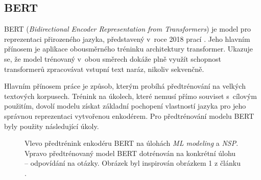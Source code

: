 \subsection{BERT}
BERT (\textit{Bidirectional Encoder Representation from Transformers}) je model pro reprezentaci přirozeného jazyka, představený v~roce 2018 prací \cite{BERT}. Jeho hlavním přínosem je aplikace obousměrného tréninku  architektury transformer. Ukazuje se, že model trénovaný v~obou směrech dokáže plně využít schopnost transformerů zpracovávat vstupní text naráz, nikoliv sekvenčně.\par\smallskip
Hlavním přínosem práce \cite{BERT} je způsob, kterým probíhá předtrénování na velkých textových korpusech. Trénink na úkolech, které nemusí přímo souviset s~cílovým použitím, dovolí modelu získat základní pochopení vlastností jazyka pro jeho správnou reprezentaci vytvořenou enkodérem. Pro předtrénování modelu BERT byly použity následující úkoly.

\begin{figure}[hbt]
	\centering
	\caption{Vlevo předtrénink enkodéru BERT na úlohách \emph{ML modeling} a \emph{NSP}. Vpravo předtrénovaný model BERT dotrénován na konkrétní úlohu -- odpovídání na otázky. Obrázek byl inspirován obrázkem 1 z článku \cite{BERT}.}
	\label{bert}
\end{figure}

